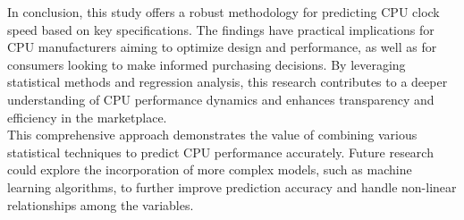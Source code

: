 In conclusion, this study offers a robust methodology for predicting CPU clock speed based on key specifications. The findings have practical implications for CPU manufacturers aiming to optimize design and performance, as well as for consumers looking to make informed purchasing decisions. By leveraging statistical methods and regression analysis, this research contributes to a deeper understanding of CPU performance dynamics and enhances transparency and efficiency in the marketplace.\\

This comprehensive approach demonstrates the value of combining various statistical techniques to predict CPU performance accurately. Future research could explore the incorporation of more complex models, such as machine learning algorithms, to further improve prediction accuracy and handle non-linear relationships among the variables.\\

\newpage